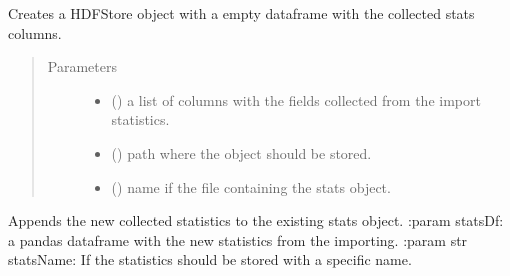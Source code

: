 \documentclass[letterpaper,10pt,english]{sphinxmanual}
\begin{document}
\begin{fulllineitems}
\label{\detokenize{_autosummary/graphdb_builder.builder:graphdb_builder.builder.importer.createEmptyStats}}
Creates a HDFStore object with a empty dataframe with the collected stats columns.
\begin{quote}\begin{description}
\item[{Parameters}] \leavevmode\begin{itemize}
\item {} 
 () \textendash{} a list of columns with the fields collected from the import statistics.

\item {} 
 () \textendash{} path where the object should be stored.

\item {} 
 () \textendash{} name if the file containing the stats object.

\end{itemize}

\end{description}\end{quote}

\end{fulllineitems}


\begin{fulllineitems}
\label{\detokenize{_autosummary/graphdb_builder.builder:graphdb_builder.builder.importer.writeStats}}
Appends the new collected statistics to the existing stats object.
:param statsDf: a pandas dataframe with the new statistics from the importing.
:param str statsName: If the statistics should be stored with a specific name.

\end{fulllineitems}
\end{document}
